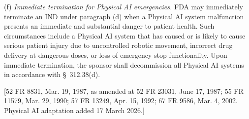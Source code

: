 (f) \textit{Immediate termination for Physical AI emergencies.} FDA may immediately terminate an IND under paragraph (d) when a Physical AI system malfunction presents an immediate and substantial danger to patient health. Such circumstances include a Physical AI system that has caused or is likely to cause serious patient injury due to uncontrolled robotic movement, incorrect drug delivery at dangerous doses, or loss of emergency stop functionality. Upon immediate termination, the sponsor shall decommission all Physical AI systems in accordance with \S~312.38(d).

[52 FR 8831, Mar. 19, 1987, as amended at 52 FR 23031, June 17, 1987; 55 FR 11579, Mar. 29, 1990; 57 FR 13249, Apr. 15, 1992; 67 FR 9586, Mar. 4, 2002. Physical AI adaptation added 17 March 2026.]
